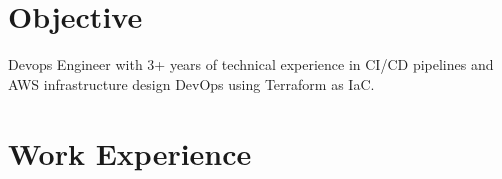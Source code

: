 \documentclass[a4paper, oneside, final]{scrartcl} %
\begin{document}
\begin{center} %


{\fontsize{36}{36}\selectfont\scshape{}} %

\vspace{1cm} %


\section{Objective}

Devops Engineer with 3+ years of technical experience in CI/CD pipelines and AWS infrastructure design DevOps using Terraform as IaC.



\section{Work Experience}


\end{center}
\end{document}
